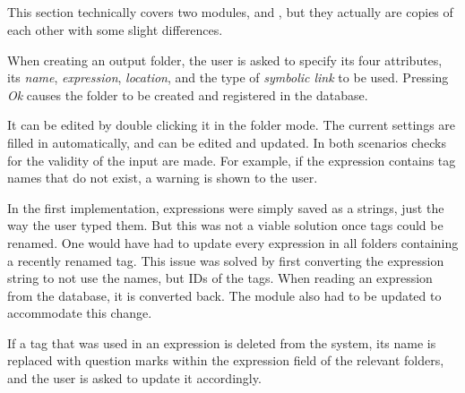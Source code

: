 \subsection{}
\def\kapitelautor{Erik Ritschl}

\begin{sloppypar}
	This section technically covers two modules,  and , but they actually are copies of each other with some slight differences. 
\end{sloppypar}

When creating an output folder, the user is asked to specify its four attributes, its \emph{name}, \emph{expression}, \emph{location}, and the type of \emph{symbolic link} to be used. Pressing \emph{Ok} causes the folder to be created and registered in the database.

It can be edited by double clicking it in the folder mode. The current settings are filled in automatically, and can be edited and updated. In both scenarios checks for the validity of the input are made. For example, if the expression contains tag names that do not exist, a warning is shown to the user. 

In the first implementation, expressions were simply saved as a strings, just the way the user typed them. But this was not a viable solution once tags could be renamed. One would have had to update every expression in all folders containing a recently renamed tag. This issue was solved by first converting the expression string to not use the names, but IDs of the tags. When reading an expression from the database, it is converted back. The  module also had to be updated to accommodate this change. 

If a tag that was used in an expression is deleted from the system, its name is replaced with question marks within the expression field of the relevant folders, and the user is asked to update it accordingly.